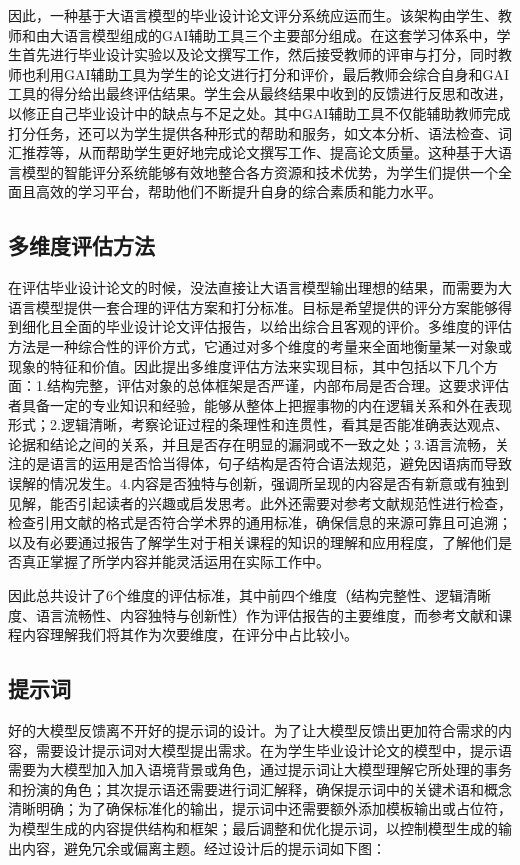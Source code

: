 \documentclass{article}
\begin{document}
因此，一种基于大语言模型的毕业设计论文评分系统应运而生。该架构由学生、教师和由大语言模型组成的GAI辅助工具三个主要部分组成。在这套学习体系中，学生首先进行毕业设计实验以及论文撰写工作，然后接受教师的评审与打分，同时教师也利用GAI辅助工具为学生的论文进行打分和评价，最后教师会综合自身和GAI工具的得分给出最终评估结果。学生会从最终结果中收到的反馈进行反思和改进，以修正自己毕业设计中的缺点与不足之处。其中GAI辅助工具不仅能辅助教师完成打分任务，还可以为学生提供各种形式的帮助和服务，如文本分析、语法检查、词汇推荐等，从而帮助学生更好地完成论文撰写工作、提高论文质量。这种基于大语言模型的智能评分系统能够有效地整合各方资源和技术优势，为学生们提供一个全面且高效的学习平台，帮助他们不断提升自身的综合素质和能力水平。

\subsection{多维度评估方法}

在评估毕业设计论文的时候，没法直接让大语言模型输出理想的结果，而需要为大语言模型提供一套合理的评估方案和打分标准。目标是希望提供的评分方案能够得到细化且全面的毕业设计论文评估报告，以给出综合且客观的评价。多维度的评估方法是一种综合性的评价方式，它通过对多个维度的考量来全面地衡量某一对象或现象的特征和价值。因此提出多维度评估方法来实现目标，其中包括以下几个方面：1.结构完整，评估对象的总体框架是否严谨，内部布局是否合理。这要求评估者具备一定的专业知识和经验，能够从整体上把握事物的内在逻辑关系和外在表现形式；2.逻辑清晰，考察论证过程的条理性和连贯性，看其是否能准确表达观点、论据和结论之间的关系，并且是否存在明显的漏洞或不一致之处；3.语言流畅，关注的是语言的运用是否恰当得体，句子结构是否符合语法规范，避免因语病而导致误解的情况发生。4.内容是否独特与创新，强调所呈现的内容是否有新意或有独到见解，能否引起读者的兴趣或启发思考。此外还需要对参考文献规范性进行检查，检查引用文献的格式是否符合学术界的通用标准，确保信息的来源可靠且可追溯；以及有必要通过报告了解学生对于相关课程的知识的理解和应用程度，了解他们是否真正掌握了所学内容并能灵活运用在实际工作中。

因此总共设计了6个维度的评估标准，其中前四个维度（结构完整性、逻辑清晰度、语言流畅性、内容独特与创新性）作为评估报告的主要维度，而参考文献和课程内容理解我们将其作为次要维度，在评分中占比较小。

\subsection{提示词}

好的大模型反馈离不开好的提示词的设计。\cite{ref5}为了让大模型反馈出更加符合需求的内容，需要设计提示词对大模型提出需求。在为学生毕业设计论文的模型中，提示语需要为大模型加入加入语境背景或角色，通过提示词让大模型理解它所处理的事务和扮演的角色；其次提示语还需要进行词汇解释，确保提示词中的关键术语和概念清晰明确；为了确保标准化的输出，提示词中还需要额外添加模板输出或占位符，为模型生成的内容提供结构和框架；最后调整和优化提示词，以控制模型生成的输出内容，避免冗余或偏离主题。\cite{ref6}经过设计后的提示词如下图：
\end{document}
